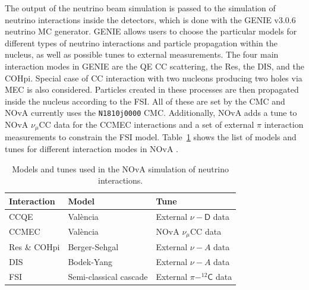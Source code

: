 
The output of the neutrino beam simulation is passed to the simulation of neutrino interactions inside the detectors, which is done with the GENIE v3.0.6~\cite{GENIE.pdf} neutrino \gls{MC} generator. GENIE allows users to choose the particular models for different types of neutrino interactions and particle propagation within the nucleus, as well as possible tunes to external measurements. The four main interaction modes in GENIE are the \gls{QE} \gls{CC} scattering, the \gls{Res}, the \gls{DIS}, and the \gls{COHpi}. Special case of \gls{CC} interaction with two nucleons producing two holes via \gls{MEC} is also considered. Particles created in these processes are then propagated inside the nucleus according to the \gls{FSI}. All of these are set by the \gls{CMC} and \gls{NOvA} currently uses the \texttt{N1810j0000} \gls{CMC}. Additionally, \gls{NOvA} adds a tune to \gls{NOvA} $\nu_\mu$\gls{CC} data for the \gls{CC}\gls{MEC} interactions and a set of external $\pi$ interaction measurements to constrain the \gls{FSI} model. Table~\ref{tab:NuIntSimulationModels} shows the list of models and tunes for different interaction modes in \gls{NOvA} \cite{NOvAResults2021.pdf}.

\begin{table}[!ht]
\centering
\caption{Models and tunes used in the NOvA simulation of neutrino interactions.}
\begin{tabular}{|l|l|l|}
\hline
Interaction & Model                  & Tune\\\hline
\gls{CC}\gls{QE} & Val\`{e}ncia \cite{ValenciaModel_NOvACCQE_2004.pdf} & External $\nu-\textsf{D}$ data \cite{NuDeuteriumScattering_NOvACCQETune_2016.pdf}\\
\gls{CC}\gls{MEC} & Val\`{e}ncia \cite{ValenciaModel_NOvACCQEMEC_2011.pdf,ValenciaModel_NOvAMEC_2013.pdf} & \gls{NOvA} $\nu_\mu$\gls{CC} data\\
\gls{Res} \& \gls{COHpi} & Berger-Sehgal \cite{BergerSehgal_ResonancePionProd_2007.pdf,BergerSehgalModel_CohPionProd_2009.pdf}          & External $\nu-A$ data\\
\gls{DIS} & Bodek-Yang \cite{BodekYangModel_NOvADIS_2003.pdf,HadronizationModelForNuDIS_NOvADIS_1988.pdf}            & External $\nu-A$ data\\
\gls{FSI} & Semi-classical cascade \cite{FSIModel_hNSemiClassicalCascade_1988.pdf} & External $\pi-^{12}\textsf{C}$ data\\\hline
\end{tabular}
\label{tab:NuIntSimulationModels}
\end{table}

